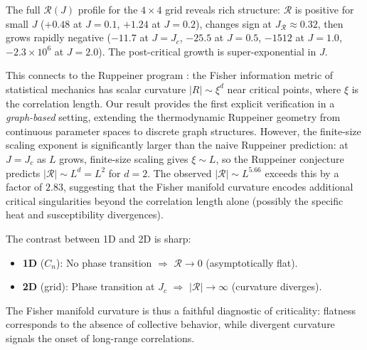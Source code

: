 \documentclass[11pt]{article}
\theoremstyle{definition}
\theoremstyle{remark}
\newcommand{\Scal}{\mathcal{R}}
\begin{document}
The full $\Scal(J)$ profile for the $4 \times 4$ grid reveals rich structure:
$\Scal$ is positive for small $J$ ($+0.48$ at $J{=}0.1$, $+1.24$ at
$J{=}0.2$), changes sign at $J_{\Scal} \approx 0.32$, then grows rapidly
negative ($-11.7$ at $J{=}J_c$, $-25.5$ at $J{=}0.5$, $-1512$ at
$J{=}1.0$, $-2.3 \times 10^6$ at $J{=}2.0$). The post-critical growth
is super-exponential in $J$.

This connects to the Ruppeiner program
\cite{Ruppeiner1979,Ruppeiner1995,Janke2004}: the Fisher information
metric of statistical mechanics has scalar curvature $|R| \sim \xi^d$
near critical points, where $\xi$ is the correlation length.
Our result provides the first explicit verification in a \emph{graph-based}
setting, extending the thermodynamic Ruppeiner geometry from
continuous parameter spaces to discrete graph structures.
However, the finite-size scaling exponent is significantly larger than
the naive Ruppeiner prediction: at $J = J_c$ as $L$ grows, finite-size
scaling gives $\xi \sim L$, so the Ruppeiner conjecture predicts
$|\Scal| \sim L^d = L^2$ for $d = 2$. The observed $|\Scal| \sim L^{5.66}$
exceeds this by a factor of $2.83$, suggesting that the Fisher manifold
curvature encodes additional critical singularities beyond the
correlation length alone (possibly the specific heat and susceptibility
divergences).

The contrast between 1D and 2D is sharp:
\begin{itemize}
\item \textbf{1D} ($C_n$): No phase transition $\Rightarrow$
  $\Scal \to 0$ (asymptotically flat).
\item \textbf{2D} (grid): Phase transition at $J_c$ $\Rightarrow$
  $|\Scal| \to \infty$ (curvature diverges).
\end{itemize}
The Fisher manifold curvature is thus a faithful diagnostic of
criticality: flatness corresponds to the absence of collective
behavior, while divergent curvature signals the onset of long-range
correlations.
\end{document}
